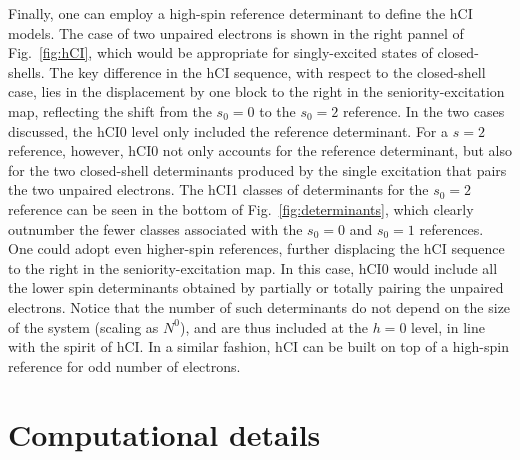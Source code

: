 \documentclass[aip,jcp,reprint,noshowkeys,superscriptaddress]{revtex4-1}
\begin{document}
Finally, one can employ a high-spin reference determinant to define the hCI models.
The case of two unpaired electrons is shown in the right pannel of Fig.~\ref{fig:hCI},
which would be appropriate for singly-excited states of closed-shells.
The key difference in the hCI sequence, with respect to the closed-shell case, lies in the displacement by one block to the right in the seniority-excitation map,
reflecting the shift from the $s_0=0$ to the $s_0=2$ reference.
In the two cases discussed, the hCI0 level only included the reference determinant.
For a $s=2$ reference, however, hCI0 not only accounts for the reference determinant,
but also for the two closed-shell determinants produced by the single excitation that pairs the two unpaired electrons.
The hCI1 classes of determinants for the $s_0=2$ reference can be seen in the bottom of Fig.~\ref{fig:determinants},
which clearly outnumber the fewer classes associated with the $s_0=0$ and $s_0=1$ references.
One could adopt even higher-spin references, further displacing the hCI sequence to the right in the seniority-excitation map.
In this case, hCI0 would include all the lower spin determinants obtained by partially or totally pairing the unpaired electrons.
Notice that the number of such determinants do not depend on the size of the system (scaling as $N^0$), and are thus included at the $h=0$ level, in line with the spirit of hCI.
In a similar fashion, hCI can be built on top of a high-spin reference for odd number of electrons.


\section{Computational details}
\label{sec:compdet}
\end{document}
